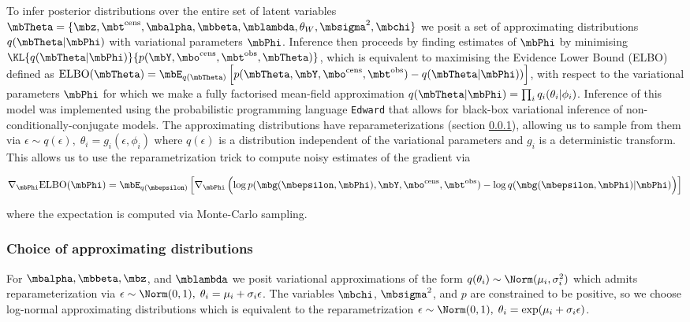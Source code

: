 To infer posterior distributions over the entire set of latent variables $\mbTheta = \{\mbz, \mbt^{\text{cens}}, \mbalpha, \mbbeta, \mblambda, \theta_W, \mbsigma^2, \mbchi\}$ we posit a set of approximating distributions $q(\mbTheta | \mbPhi)$ with variational parameters $\mbPhi$. Inference then proceeds by finding estimates of $\mbPhi$ by minimising $\KL{q(\mbTheta | \mbPhi)}{p(\mbY, \mbo^{\text{cens}}, \mbt^{\text{obs}}, \mbTheta)}$,
which is equivalent to maximising the Evidence Lower Bound (ELBO) defined as $\text{ELBO}(\mbTheta) = \mbE_{q(\mbTheta)} \left[ p(\mbTheta, \mbY, \mbo^{\text{cens}}, \mbt^{\text{obs}}) - q(\mbTheta | \mbPhi))\right]$,
with respect to the variational parameters $\mbPhi$ for which we make a fully factorised mean-field approximation $q(\mbTheta | \mbPhi) = \prod_i q_i(\theta_i | \phi_i)$.
Inference of this model was implemented using the probabilistic programming language \texttt{Edward} \citep{Tran2016-ml} that allows for black-box variational inference of non-conditionally-conjugate models. The approximating distributions have reparameterizations (section \ref{sec:approx}), allowing us to sample from them via  $\epsilon \sim q(\epsilon), \; \theta_i = g_i(\epsilon, \phi_i)$ where $q(\epsilon)$ is a distribution independent of the variational parameters and $g_i$ is a deterministic transform. This allows us to use the reparametrization trick \citep{Kingma2013-wo} to compute noisy estimates of the gradient via

\begin{equation}
  \nabla_{\mbPhi} \text{ELBO}(\mbPhi) = \mbE_{q(\mbepsilon)}
  \left[
  \nabla_{\mbPhi} \left( \log p(\mbg(\mbepsilon, \mbPhi), \mbY, \mbo^{\text{cens}}, \mbt^{\text{obs}}) - \log q(\mbg(\mbepsilon, \mbPhi) | \mbPhi)\right)
  \right]
\end{equation}

where the expectation is computed via Monte-Carlo sampling.

\subsubsection{Choice of approximating distributions} \label{sec:approx}

For $\mbalpha, \mbbeta, \mbz$, and $\mblambda$ we posit variational approximations of the form $q(\theta_i) \sim \Norm(\mu_i, \sigma_i^2)$ which admits reparameterization via $\epsilon \sim \Norm(0, 1), \; \theta_i = \mu_i + \sigma_i \epsilon$. The variables $\mbchi$, $\mbsigma^2$, and $p$ are constrained to be positive, so we choose log-normal approximating distributions which is equivalent to the reparametrization $\epsilon \sim \Norm(0, 1), \; \theta_i = \exp(\mu_i + \sigma_i \epsilon)$.

